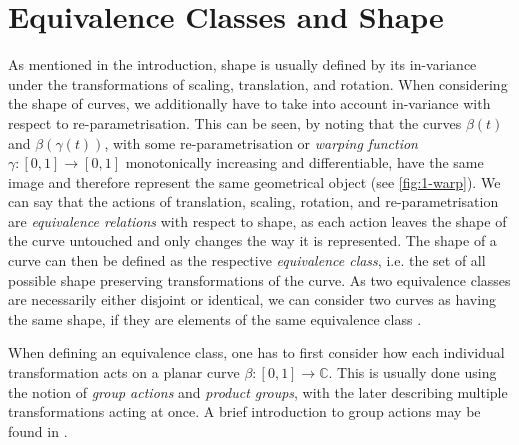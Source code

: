 \section{Equivalence Classes and Shape}
\label{sec:2-shape}
As mentioned in the introduction, shape is usually defined by its in-variance under the transformations of scaling, translation, and rotation.
When considering the shape of curves, we additionally have to take into account in-variance with respect to re-parametrisation.
This can be seen, by noting that the curves $\beta(t)$ and $\beta(\gamma(t))$, with some re-parametrisation or \textit{warping function} $\gamma : [0,1] \rightarrow [0,1]$ monotonically increasing and differentiable, have the same image and therefore represent the same geometrical object (see \cref{fig:1-warp}).
We can say that the actions of translation, scaling, rotation, and re-parametrisation are \textit{equivalence relations} with respect to shape, as each action leaves the shape of the curve untouched and only changes the way it is represented.
The shape of a curve can then be defined as the respective \textit{equivalence class}, i.e. the set of all possible shape preserving transformations of the curve.
As two equivalence classes are necessarily either disjoint or identical, we can consider two curves as having the same shape, if they are elements of the same equivalence class \parencite[see][40]{SrivastavaKlassen2016}.

When defining an equivalence class, one has to first consider how each individual transformation acts on a planar curve $\beta : [0,1] \rightarrow \mathbb{C}$.
This is usually done using the notion of \textit{group actions} and \textit{product groups}, with the later describing multiple transformations acting at once.
A brief introduction to group actions may be found in \cite[Chap.\ 3]{SrivastavaKlassen2016}.

